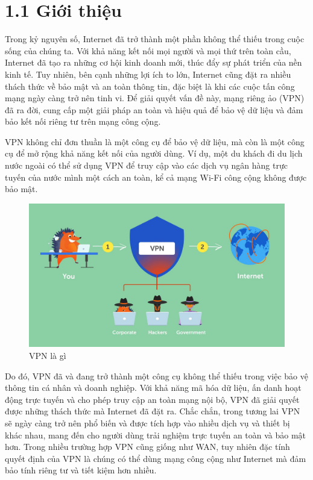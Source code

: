     \section*{1.1 Giới thiệu}
    Trong kỷ nguyên số, Internet đã trở thành một phần không thể thiếu trong cuộc sống của chúng ta. Với khả năng kết nối mọi người và mọi thứ trên toàn cầu, Internet đã tạo ra những cơ hội kinh doanh mới, thúc đẩy sự phát triển của nền kinh tế. Tuy nhiên, bên cạnh những lợi ích to lớn, Internet cũng đặt ra nhiều thách thức về bảo mật và an toàn thông tin, đặc biệt là khi các cuộc tấn công mạng ngày càng trở nên tinh vi. Để giải quyết vấn đề này, mạng riêng ảo (VPN) đã ra đời, cung cấp một giải pháp an toàn và hiệu quả để bảo vệ dữ liệu và đảm bảo kết nối riêng tư trên mạng công cộng.

    VPN không chỉ đơn thuần là một công cụ để bảo vệ dữ liệu, mà còn là một công cụ để mở rộng khả năng kết nối của người dùng. Ví dụ, một du khách đi du lịch nước ngoài có thể sử dụng VPN để truy cập vào các dịch vụ ngân hàng trực tuyến của nước mình một cách an toàn, kể cả mạng Wi-Fi công cộng không được bảo mật.
    \begin{figure}[htbp]
        \centering
        \includegraphics[width=0.7\linewidth]{img/whatvpn.png}
        \caption{VPN là gì}
    \end{figure}
    
    Do đó, VPN đã và đang trở thành một công cụ không thể thiếu trong việc bảo vệ thông tin cá nhân và doanh nghiệp. Với khả năng mã hóa dữ liệu, ấn danh hoạt động trực tuyến và cho phép truy cập an toàn mạng nội bộ, VPN đã giải quyết được những thách thức mà Internet đã đặt ra. Chắc chắn, trong tương lai VPN sẽ ngày càng trở nên phổ biến và được tích hợp vào nhiều dịch vụ và thiết bị khác nhau, mang đến cho người dùng trải nghiệm trực tuyến an toàn và bảo mật hơn. Trong nhiều trường hợp VPN cũng giống như WAN, tuy nhiên đặc tính quyết định của VPN là chúng có thể dùng mạng công cộng như Internet mà đảm bảo tính riêng tư và tiết kiệm hơn nhiều.
